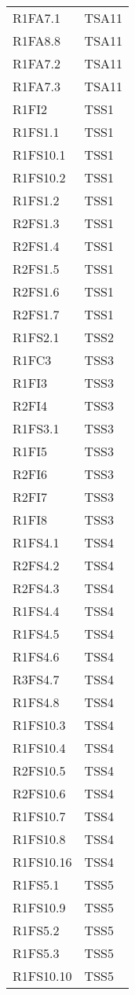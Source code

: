 {\begin{longtable}{C{4cm} C{4cm}}
R1FA7.1 & TSA11  \\
R1FA8.8 & TSA11  \\
R1FA7.2 & TSA11  \\
R1FA7.3 & TSA11  \\


R1FI2 & TSS1 \\
R1FS1.1 & TSS1 \\
R1FS10.1 & TSS1 \\
R1FS10.2 & TSS1 \\
R1FS1.2 & TSS1 \\
R2FS1.3 & TSS1 \\
R2FS1.4 & TSS1 \\
R2FS1.5 & TSS1 \\
R2FS1.6 & TSS1 \\
R2FS1.7 & TSS1 \\
R1FS2.1 & TSS2 \\
R1FC3 & TSS3 \\
R1FI3 & TSS3 \\
R2FI4 & TSS3 \\
R1FS3.1 & TSS3 \\
R1FI5 & TSS3 \\
R2FI6 & TSS3 \\
R2FI7 & TSS3 \\
R1FI8 & TSS3 \\
R1FS4.1 & TSS4 \\
R2FS4.2 & TSS4 \\
R2FS4.3 & TSS4 \\
R1FS4.4 & TSS4 \\
R1FS4.5 & TSS4 \\
R1FS4.6 & TSS4 \\
R3FS4.7 & TSS4 \\
R1FS4.8 & TSS4 \\
R1FS10.3 & TSS4 \\
R1FS10.4 & TSS4 \\
R2FS10.5 & TSS4 \\
R2FS10.6 & TSS4 \\
R1FS10.7 & TSS4 \\
R1FS10.8 & TSS4 \\
R1FS10.16 & TSS4 \\
R1FS5.1 & TSS5 \\
R1FS10.9 & TSS5 \\
R1FS5.2 & TSS5 \\
R1FS5.3 & TSS5 \\
R1FS10.10 & TSS5 \\

\end{longtable}}
